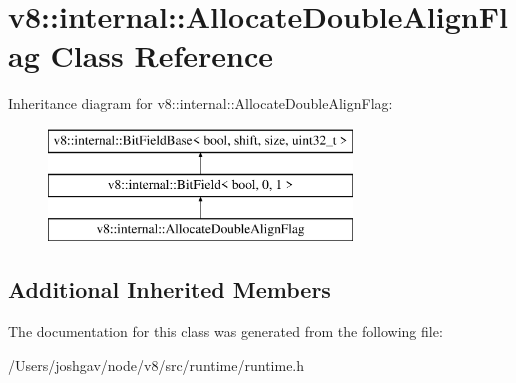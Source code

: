 \hypertarget{classv8_1_1internal_1_1_allocate_double_align_flag}{}\section{v8\+:\+:internal\+:\+:Allocate\+Double\+Align\+Flag Class Reference}
\label{classv8_1_1internal_1_1_allocate_double_align_flag}
Inheritance diagram for v8\+:\+:internal\+:\+:Allocate\+Double\+Align\+Flag\+:\begin{figure}[H]
\begin{center}
\leavevmode
\includegraphics[height=3.000000cm]{classv8_1_1internal_1_1_allocate_double_align_flag}
\end{center}
\end{figure}
\subsection*{Additional Inherited Members}


The documentation for this class was generated from the following file\+:\begin{DoxyCompactItemize}
\item 
/\+Users/joshgav/node/v8/src/runtime/runtime.\+h\end{DoxyCompactItemize}
